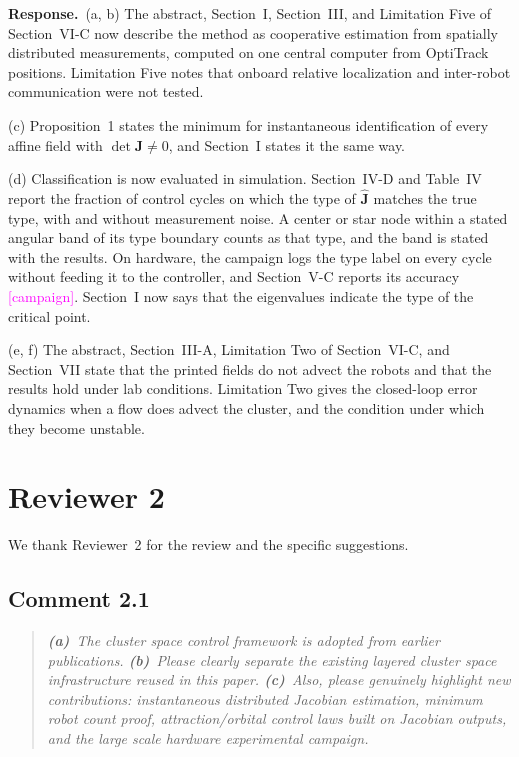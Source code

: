 \documentclass[10pt]{article}
\newcommand{\open}[1]{\textcolor{magenta}{[#1]}}     %
\newcommand{\resp}{\par\textbf{Response.}~}
\begin{document}
\resp (a, b) The abstract, Section~I, Section~III, and Limitation Five of Section~VI-C now describe the method as cooperative estimation from spatially distributed measurements, computed on one central computer from OptiTrack positions. Limitation Five notes that onboard relative localization and inter-robot communication were not tested.

(c) Proposition~1 states the minimum for instantaneous identification of every affine field with $\det\mathbf{J} \neq 0$, and Section~I states it the same way.

(d) Classification is now evaluated in simulation. Section~IV-D and Table~IV report the fraction of control cycles on which the type of $\hat{\mathbf{J}}$ matches the true type, with and without measurement noise. A center or star node within a stated angular band of its type boundary counts as that type, and the band is stated with the results. On hardware, the campaign logs the type label on every cycle without feeding it to the controller, and Section~V-C reports its accuracy \open{campaign}. Section~I now says that the eigenvalues indicate the type of the critical point.

(e, f) The abstract, Section~III-A, Limitation Two of Section~VI-C, and Section~VII state that the printed fields do not advect the robots and that the results hold under lab conditions. Limitation Two gives the closed-loop error dynamics when a flow does advect the cluster, and the condition under which they become unstable.

\section*{Reviewer 2}
We thank Reviewer~2 for the review and the specific suggestions.

\subsection*{Comment 2.1}

\begin{quote}\itshape
\textbf{(a)}~The cluster space control framework is adopted from earlier publications.
\textbf{(b)}~Please clearly separate the existing layered cluster space infrastructure reused in this paper.
\textbf{(c)}~Also, please genuinely highlight new contributions: instantaneous distributed Jacobian estimation, minimum robot count proof, attraction/orbital control laws built on Jacobian outputs, and the large scale hardware experimental campaign.
\end{quote}
\end{document}
